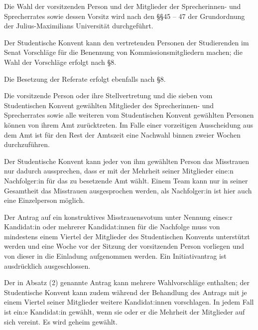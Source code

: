 \documentclass[10pt,a4paper]{scrartcl}
\begin{document}
\begin{contract}


\label{allgemeines}

Die Wahl der vorsitzenden Person und der Mitglieder der Sprecherinnen- und
Sprecherrates sowie dessen Vorsitz wird nach den §§45 -- 47 der Grundordnung der
Julius-Maximilians Universität durchgeführt.

Der Studentische Konvent kann den vertretenden Personen der Studierenden im
Senat Vorschläge für die Benennung von Kommissionsmitgliedern machen; die Wahl
der Vorschläge erfolgt nach §8.

Die Besetzung der Referate erfolgt ebenfalls nach §8.


\label{ruxfccktritt-von-neuwahl}

Die vorsitzende Person oder ihre Stellvertretung und die sieben vom
Studentischen Konvent gewählten Mitglieder des Sprecherinnen- und
Sprecherrates sowie alle weiteren vom Studentischen Konvent gewählten
Personen können von ihrem Amt zurücktreten. Im Falle einer vorzeitigen
Ausscheidung aus dem Amt ist für den Rest der Amtszeit eine Nachwahl
binnen zweier Wochen durchzuführen.


\label{konstruktives-misstrauensvotum}

  Der Studentische Konvent kann jeder von ihm gewählten Person das
  Misstrauen nur dadurch aussprechen, dass er mit der Mehrheit seiner
  Mitglieder eine:n Nachfolger:in für das zu besetzende Amt wählt. Einem
  Team kann nur in seiner Gesamtheit das Misstrauen ausgesprochen
  werden, als Nachfolger:in ist hier auch eine Einzelperson möglich.
  
	Der Antrag auf ein konstruktives Misstrauensvotum unter Nennung
  eines:r Kandidat:in oder mehrerer Kandidat:innen für die Nachfolge
  muss von mindestens einem Viertel der Mitglieder des Studentischen
  Konvents unterstützt werden und eine Woche vor der Sitzung der
  vorsitzenden Person vorliegen und von dieser in die Einladung
  aufgenommen werden. Ein Initiativantrag ist ausdrücklich
  ausgeschlossen.
     
	Der in Absatz (2) genannte Antrag kann mehrere Wahlvorschläge enthalten;
  der Studentische Konvent kann zudem während der Behandlung des Antrags
  mit je einem Viertel seiner Mitglieder weitere Kandidat:innen
  vorschlagen. In jedem Fall ist ein:e Kandidat:in gewählt, wenn sie
  oder er die Mehrheit der Mitglieder auf sich vereint. Es wird geheim
  gewählt.
     

\end{contract}
\end{document}
